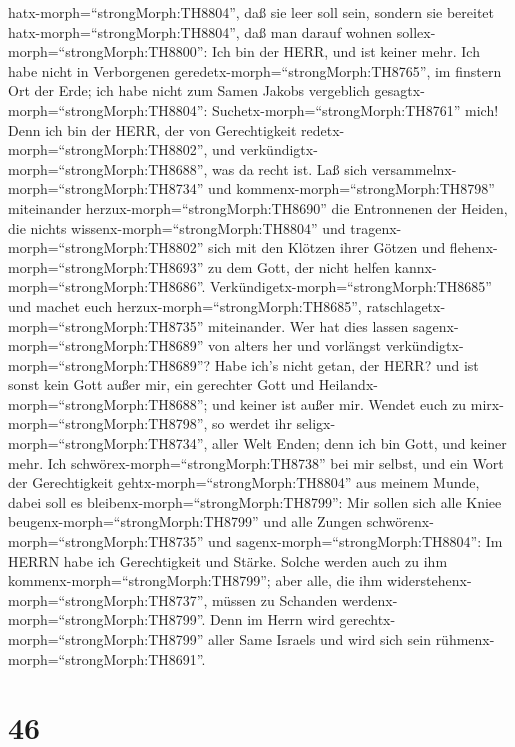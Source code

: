 hatx-morph=``strongMorph:TH8804'', daß sie leer soll sein, sondern sie
bereitet hatx-morph=``strongMorph:TH8804'', daß man darauf wohnen
sollex-morph=``strongMorph:TH8800'': Ich bin der HERR, und ist keiner
mehr.  Ich habe nicht in Verborgenen
geredetx-morph=``strongMorph:TH8765'', im finstern Ort der Erde; ich
habe nicht zum Samen Jakobs vergeblich
gesagtx-morph=``strongMorph:TH8804'':
Suchetx-morph=``strongMorph:TH8761'' mich! Denn ich bin der HERR, der
von Gerechtigkeit redetx-morph=``strongMorph:TH8802'', und
verkündigtx-morph=``strongMorph:TH8688'', was da recht ist.
 Laß sich versammelnx-morph=``strongMorph:TH8734'' und
kommenx-morph=``strongMorph:TH8798'' miteinander
herzux-morph=``strongMorph:TH8690'' die Entronnenen der Heiden, die
nichts wissenx-morph=``strongMorph:TH8804'' und
tragenx-morph=``strongMorph:TH8802'' sich mit den Klötzen ihrer Götzen
und flehenx-morph=``strongMorph:TH8693'' zu dem Gott, der nicht helfen
kannx-morph=``strongMorph:TH8686''. 
Verkündigetx-morph=``strongMorph:TH8685'' und machet euch
herzux-morph=``strongMorph:TH8685'',
ratschlagetx-morph=``strongMorph:TH8735'' miteinander. Wer hat dies
lassen sagenx-morph=``strongMorph:TH8689'' von alters her und vorlängst
verkündigtx-morph=``strongMorph:TH8689''? Habe ich's nicht getan, der
HERR? und ist sonst kein Gott außer mir, ein gerechter Gott und
Heilandx-morph=``strongMorph:TH8688''; und keiner ist außer mir.
 Wendet euch zu mirx-morph=``strongMorph:TH8798'', so
werdet ihr seligx-morph=``strongMorph:TH8734'', aller Welt Enden; denn
ich bin Gott, und keiner mehr.  Ich
schwörex-morph=``strongMorph:TH8738'' bei mir selbst, und ein Wort der
Gerechtigkeit gehtx-morph=``strongMorph:TH8804'' aus meinem Munde, dabei
soll es bleibenx-morph=``strongMorph:TH8799'': Mir sollen sich alle
Kniee beugenx-morph=``strongMorph:TH8799'' und alle Zungen
schwörenx-morph=``strongMorph:TH8735''  und
sagenx-morph=``strongMorph:TH8804'': Im HERRN habe ich Gerechtigkeit und
Stärke. Solche werden auch zu ihm kommenx-morph=``strongMorph:TH8799'';
aber alle, die ihm widerstehenx-morph=``strongMorph:TH8737'', müssen zu
Schanden werdenx-morph=``strongMorph:TH8799''.  Denn im
Herrn wird gerechtx-morph=``strongMorph:TH8799'' aller Same Israels und
wird sich sein rühmenx-morph=``strongMorph:TH8691''.

\hypertarget{section-45}{%
\section{46}\label{section-45}}

